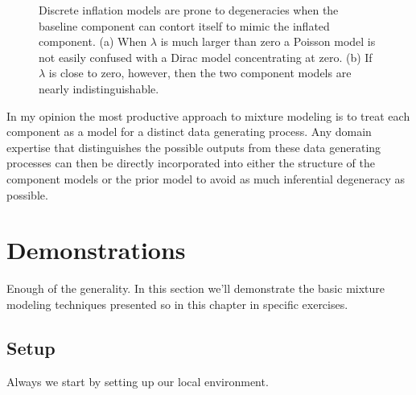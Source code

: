 \documentclass[
  letterpaper,
  DIV=11,
  numbers=noendperiod]{scrartcl}
\begin{document}
\begin{figure}
\begin{minipage}{0.45\linewidth}
{}

\subcaption{\label{fig-zip_degen-overlapping}}

\end{minipage}%

\caption{\label{fig-zip_degen}Discrete inflation models are prone to
degeneracies when the baseline component can contort itself to mimic the
inflated component. (a) When \(\lambda\) is much larger than zero a
Poisson model is not easily confused with a Dirac model concentrating at
zero. (b) If \(\lambda\) is close to zero, however, then the two
component models are nearly indistinguishable.}

\end{figure}%

In my opinion the most productive approach to mixture modeling is to
treat each component as a model for a distinct data generating process.
Any domain expertise that distinguishes the possible outputs from these
data generating processes can then be directly incorporated into either
the structure of the component models or the prior model to avoid as
much inferential degeneracy as possible.

\section{Demonstrations}\label{demonstrations}

Enough of the generality. In this section we'll demonstrate the basic
mixture modeling techniques presented so in this chapter in specific
exercises.

\subsection{Setup}\label{setup}

Always we start by setting up our local environment.
\end{document}
